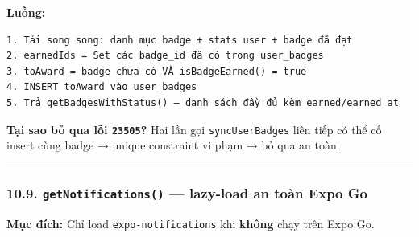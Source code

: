 \documentclass[12pt,a4paper]{article}
\begin{document}
\begin{Shaded}
\begin{Highlighting}[]
   \OperatorTok{\textgreater{}} \NormalTok{) \{}
    \NormalTok{(}\NormalTok{)}\NormalTok{(}
\KeywordTok{=\textgreater{}}\OperatorTok{:}\OperatorTok{,}\OperatorTok{:}\NormalTok{ \}))}\OperatorTok{,}
\NormalTok{    )}\OperatorTok{;}
\NormalTok{  \}}
   \OperatorTok{;}
\NormalTok{\}}
\end{Highlighting}
\end{Shaded}

\textbf{Luồng:}

\begin{verbatim}
1. Tải song song: danh mục badge + stats user + badge đã đạt
2. earnedIds = Set các badge_id đã có trong user_badges
3. toAward = badge chưa có VÀ isBadgeEarned() = true
4. INSERT toAward vào user_badges
5. Trả getBadgesWithStatus() — danh sách đầy đủ kèm earned/earned_at
\end{verbatim}

\textbf{Tại sao bỏ qua lỗi \texttt{23505}?} Hai lần gọi
\texttt{syncUserBadges} liên tiếp có thể cố insert cùng badge → unique
constraint vi phạm → bỏ qua an toàn.

\begin{center}\rule{0.5\linewidth}{0.5pt}\end{center}

\subsubsection{\texorpdfstring{10.9. \texttt{getNotifications()} ---
lazy-load an toàn Expo
Go}{10.9. getNotifications() --- lazy-load an toàn Expo Go}}\label{getnotifications-lazy-load-an-touxe0n-expo-go}

\textbf{Mục đích:} Chỉ load \texttt{expo-notifications} khi
\textbf{không} chạy trên Expo Go.
\end{document}
